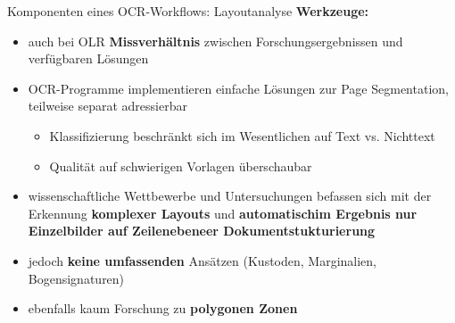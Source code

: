 \documentclass{bbawslides}
\begin{document}
\begin{bbawslide}{Komponenten eines OCR-Workflows: Layoutanalyse}
  \vspace*{2mm}%
  \centerslidestrue%
  \textbf{Werkzeuge:}
  \begin{itemize}
    \item auch bei OLR \textbf{Missverhältnis} zwischen Forschungsergebnissen und verfügbaren Lösungen
    \item OCR-Programme implementieren einfache Lösungen zur Page Segmentation, teilweise separat adressierbar
    \begin{itemize} \small
        \item Klassifizierung beschränkt sich im Wesentlichen auf Text vs. Nichttext
        \item Qualität auf schwierigen Vorlagen überschaubar
    \end{itemize}
    \item wissenschaftliche Wettbewerbe und Untersuchungen befassen sich mit der Erkennung \textbf{komplexer Layouts} und \textbf{automatischim Ergebnis nur Einzelbilder auf Zeilenebeneer Dokumentstukturierung}
    \item jedoch \textbf{keine umfassenden} Ansätzen (Kustoden, Marginalien, Bogensignaturen)
    \item ebenfalls kaum Forschung zu \textbf{polygonen Zonen}
  \end{itemize}
\end{bbawslide}
\end{document}

